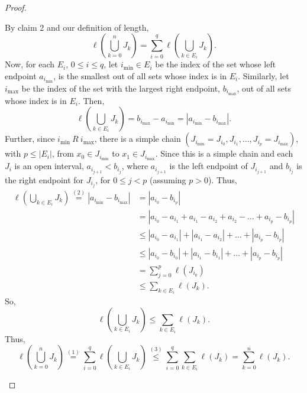 \documentclass[12pt]{article}
\begin{document}
\begin{proof}
\begin{itemize}[label={},leftmargin=8mm, itemsep=1em, parsep=1em]
By claim 2 and our definition of length,
\begin{equation}
\ell\left(\bigcup_{k=0}^{n}J_{k}\right) = \sum_{i=0}^{q}\ell\left(\bigcup_{k\in
E_{i}}J_{k}\right).
\end{equation}
Now, for each $E_{i}$, $0 \leq i \leq q$, let $i_{\min}\in E_{i}$ be the index
of the set whose left endpoint $a_{i_{\min}}$, is the smallest out of all sets
whose index is in $E_{i}$. Similarly, let $i_{\max}$ be the index of the set
with the largest right endpoint, $b_{i_{\max}}$, out of all sets whose index is
in $E_{i}$. Then,
\begin{equation}
\ell\left(\bigcup_{k\in E_{i}}J_{k}\right) = b_{i_{\max}} - a_{i_{\min}} =
|a_{i_{\min}} - b_{i_{\max}}|.
\end{equation}
Further, since $i_{\min}\ R\ i_{\max}$, there is a simple chain $(J_{i_{\min}} =
J_{i_{0}}, J_{i_{1}}, \dots, J_{i_{p}} = J_{i_{\max}})$, with $p \leq |E_{i}|$,
from $x_{0} \in J_{i_{\min}}$ to $x_{1} \in J_{i_{\max}}$. Since this is a
simple chain and each $J_{i}$ is an open interval, $a_{i_{j+1}} < b_{i_{j}}$,
where $a_{i_{j+1}}$ is the left endpoint of $J_{i_{j+1}}$ and $b_{i_{j}}$ is the
right endpoint for $J_{i_{j}}$, for $0 \leq j < p$ (assuming $p > 0$). Thus,
\begin{align*}
\ell\left(\bigcup_{k\in E_{i}}J_{k}\right) \stackrel{(2)}{=} |a_{i_{\min}} -
b_{i_{\max}}| & = |a_{i_{0}} - b_{i_{p}}| \\
& = |a_{i_{0}} - a_{i_{1}} + a_{i_{1}} - a_{i_{2}} + a_{i_{2}} - \dots +
a_{i_{p}} - b_{i_{p}}| \\
& \leq |a_{i_{0}} - a_{i_{1}}| + |a_{i_{1}} - a_{i_{2}}| + \dots + |a_{i_{p}} -
b_{i_{p}}| \\
& \leq |a_{i_{0}} - b_{i_{0}}| + |a_{i_{1}} - b_{i_{1}}| + \dots + |a_{i_{p}} -
b_{i_{p}}| \\
& = \sum_{j=0}^{p}\ell(J_{i_{0}}) \\
& \leq \sum_{k\in E_{i}}\ell(J_{k}).
\end{align*}
So,
\begin{equation}
\ell\left(\bigcup_{k\in E_{i}}J_{k}\right) \leq \sum_{k\in E_{i}}\ell(J_{k}).
\end{equation}
Thus,
\[ \ell\left(\bigcup_{k=0}^{n}J_{k}\right) \stackrel{(1)}{=}
\sum_{i=0}^{q}\ell\left(\bigcup_{k\in E_{i}}J_{k}\right) \stackrel{(3)}{\leq}
\sum_{i=0}^{q}\sum_{k\in E_{i}}\ell(J_{k}) = \sum_{k=0}^{n}\ell(J_{k}). \]

\end{itemize}
\end{proof}
\end{document}
